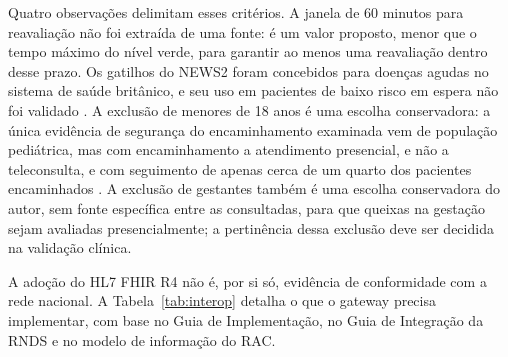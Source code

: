 Quatro observações delimitam esses critérios. A janela de 60 minutos para reavaliação não foi extraída de uma fonte: é um valor proposto, menor que o tempo máximo do nível verde, para garantir ao menos uma reavaliação dentro desse prazo. Os gatilhos do NEWS2 foram concebidos para doenças agudas no sistema de saúde britânico, e seu uso em pacientes de baixo risco em espera não foi validado \cite{rcp2017news2}. A exclusão de menores de 18 anos é uma escolha conservadora: a única evidência de segurança do encaminhamento examinada vem de população pediátrica, mas com encaminhamento a atendimento presencial, e não a teleconsulta, e com seguimento de apenas cerca de um quarto dos pacientes encaminhados \cite{sorznechay2025}. A exclusão de gestantes também é uma escolha conservadora do autor, sem fonte específica entre as consultadas, para que queixas na gestação sejam avaliadas presencialmente; a pertinência dessa exclusão deve ser decidida na validação clínica.

\label{sec:res-rnds}

A adoção do HL7 FHIR R4 não é, por si só, evidência de conformidade com a rede nacional. A Tabela~\ref{tab:interop} detalha o que o gateway precisa implementar, com base no Guia de Implementação, no Guia de Integração da RNDS e no modelo de informação do RAC.

